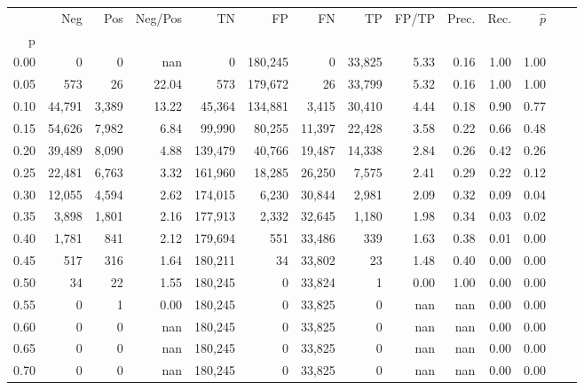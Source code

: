 \begin{tabular}{rrrrrrrrrrrrrr}
\toprule
{} &     Neg &    Pos & Neg/Pos &       TN &       FP &      FN &      TP & FP/TP & Prec. &  Rec. & $\hat{p}$ \\
p    &         &        &         &          &          &         &         &       &       &       &           \\
\midrule
0.00 &       0 &      0 &     nan &        0 &  180,245 &       0 &  33,825 &  5.33 &  0.16 &  1.00 &      1.00 \\
0.05 &     573 &     26 &   22.04 &      573 &  179,672 &      26 &  33,799 &  5.32 &  0.16 &  1.00 &      1.00 \\
0.10 &  44,791 &  3,389 &   13.22 &   45,364 &  134,881 &   3,415 &  30,410 &  4.44 &  0.18 &  0.90 &      0.77 \\
0.15 &  54,626 &  7,982 &    6.84 &   99,990 &   80,255 &  11,397 &  22,428 &  3.58 &  0.22 &  0.66 &      0.48 \\
0.20 &  39,489 &  8,090 &    4.88 &  139,479 &   40,766 &  19,487 &  14,338 &  2.84 &  0.26 &  0.42 &      0.26 \\
0.25 &  22,481 &  6,763 &    3.32 &  161,960 &   18,285 &  26,250 &   7,575 &  2.41 &  0.29 &  0.22 &      0.12 \\
0.30 &  12,055 &  4,594 &    2.62 &  174,015 &    6,230 &  30,844 &   2,981 &  2.09 &  0.32 &  0.09 &      0.04 \\
0.35 &   3,898 &  1,801 &    2.16 &  177,913 &    2,332 &  32,645 &   1,180 &  1.98 &  0.34 &  0.03 &      0.02 \\
0.40 &   1,781 &    841 &    2.12 &  179,694 &      551 &  33,486 &     339 &  1.63 &  0.38 &  0.01 &      0.00 \\
0.45 &     517 &    316 &    1.64 &  180,211 &       34 &  33,802 &      23 &  1.48 &  0.40 &  0.00 &      0.00 \\
0.50 &      34 &     22 &    1.55 &  180,245 &        0 &  33,824 &       1 &  0.00 &  1.00 &  0.00 &      0.00 \\
0.55 &       0 &      1 &    0.00 &  180,245 &        0 &  33,825 &       0 &   nan &   nan &  0.00 &      0.00 \\
0.60 &       0 &      0 &     nan &  180,245 &        0 &  33,825 &       0 &   nan &   nan &  0.00 &      0.00 \\
0.65 &       0 &      0 &     nan &  180,245 &        0 &  33,825 &       0 &   nan &   nan &  0.00 &      0.00 \\
0.70 &       0 &      0 &     nan &  180,245 &        0 &  33,825 &       0 &   nan &   nan &  0.00 &      0.00 \\

\end{tabular}
